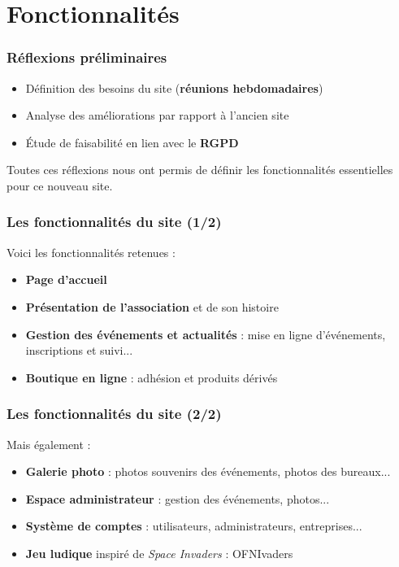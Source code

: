 \section{Fonctionnalités}

\begin{frame}
    \frametitle{Réflexions préliminaires}

    \begin{itemize}
        \item Définition des besoins du site (\textbf{réunions hebdomadaires})
        \item Analyse des améliorations par rapport à l’ancien site
        \item Étude de faisabilité en lien avec le \textbf{RGPD}
    \end{itemize}
    \bigskip
    
    Toutes ces réflexions nous ont permis de définir les fonctionnalités essentielles pour ce nouveau site.
\end{frame}

\begin{frame}
    \frametitle{Les fonctionnalités du site (1/2)}

    Voici les fonctionnalités retenues : 

    \begin{itemize}
	\item \textbf{Page d'accueil}
        \item \textbf{Présentation de l’association} et de son histoire
        \item \textbf{Gestion des événements et actualités} :  mise en ligne d'événements, inscriptions et suivi...
        \item \textbf{Boutique en ligne} : adhésion et produits dérivés
    \end{itemize}
\end{frame}

\begin{frame}
    \frametitle{Les fonctionnalités du site (2/2)}

    Mais également : 

    \begin{itemize}
        \item \textbf{Galerie photo} : photos souvenirs des événements, photos des bureaux...
        \item \textbf{Espace administrateur} : gestion des événements, photos...
        \item \textbf{Système de comptes} : utilisateurs, administrateurs, entreprises...
        \item \textbf{Jeu ludique} inspiré de \textit{Space Invaders} : OFNIvaders
    \end{itemize}
\end{frame}




